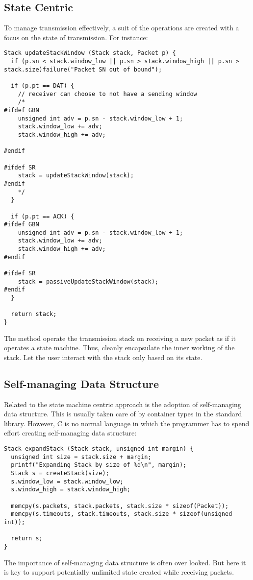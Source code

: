 \documentclass[12pt]{article}
\begin{document}
\subsection{State Centric}
To manage transmission effectively, a suit of the operations are created with a focus on the state of transmission. For instance:
\begin{samepage}
\begin{verbatim}
Stack updateStackWindow (Stack stack, Packet p) {
  if (p.sn < stack.window_low || p.sn > stack.window_high || p.sn > stack.size)failure("Packet SN out of bound");
  
  if (p.pt == DAT) {
    // receiver can choose to not have a sending window
    /*
#ifdef GBN    
    unsigned int adv = p.sn - stack.window_low + 1;
    stack.window_low += adv;
    stack.window_high += adv;
    
#endif

#ifdef SR
    stack = updateStackWindow(stack);
#endif
    */
  }
  
  if (p.pt == ACK) {
#ifdef GBN
    unsigned int adv = p.sn - stack.window_low + 1;
    stack.window_low += adv;
    stack.window_high += adv;
#endif

#ifdef SR
    stack = passiveUpdateStackWindow(stack);
#endif
  }
  
  return stack;
}
\end{verbatim}
\end{samepage}
The method operate the transmission stack on receiving a new packet as if it operates a state machine. Thus, cleanly encapsulate the inner working of the stack. Let the user interact with the stack only based on its state.

\subsection{Self-managing Data Structure}
Related to the state machine centric approach is the adoption of self-managing data structure. This is usually taken care of by container types in the standard library. However, C is no normal language in which the programmer has to spend effort creating self-managing data structure:
\begin{samepage}
\begin{verbatim}
Stack expandStack (Stack stack, unsigned int margin) {
  unsigned int size = stack.size + margin;
  printf("Expanding Stack by size of %d\n", margin);
  Stack s = createStack(size);
  s.window_low = stack.window_low;
  s.window_high = stack.window_high;
  
  memcpy(s.packets, stack.packets, stack.size * sizeof(Packet));
  memcpy(s.timeouts, stack.timeouts, stack.size * sizeof(unsigned int));
  
  return s;
}
\end{verbatim}
\end{samepage}
The importance of self-managing data structure is often over looked. But here it is key to support potentially unlimited state created while receiving packets.
\end{document}
